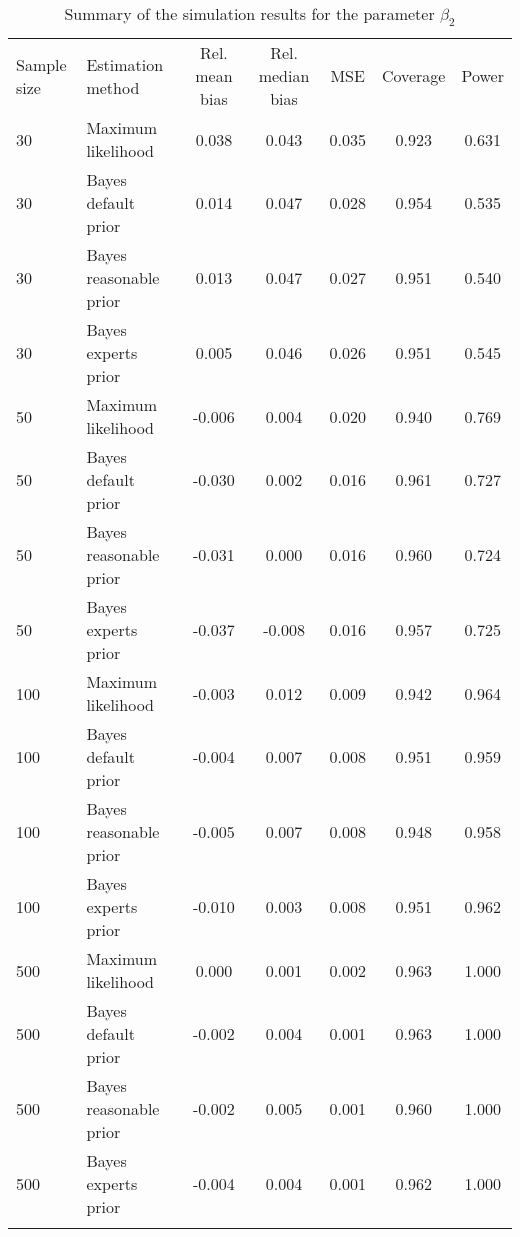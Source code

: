 \documentclass[graybox]{svmult}
\begin{document}
\begin{table}
\caption{Summary of the simulation results for the parameter $\beta_2$}
\begin{tabular}[t]{llccccc}
\hline\noalign{\smallskip}
Sample size & Estimation method & Rel. mean bias & Rel. median bias & MSE & Coverage & Power\\
\noalign{\smallskip}\svhline\noalign{\smallskip}
30 & Maximum likelihood & 0.038 & 0.043 & 0.035 & 0.923 & 0.631\\
30 & Bayes default prior & 0.014 & 0.047 & 0.028 & 0.954 & 0.535\\
30 & Bayes reasonable prior & 0.013 & 0.047 & 0.027 & 0.951 & 0.540\\
30 & Bayes experts prior & 0.005 & 0.046 & 0.026 & 0.951 & 0.545\\
\noalign{\smallskip}
50 & Maximum likelihood & -0.006 & 0.004 & 0.020 & 0.940 & 0.769\\
50 & Bayes default prior & -0.030 & 0.002 & 0.016 & 0.961 & 0.727\\
50 & Bayes reasonable prior & -0.031 & 0.000 & 0.016 & 0.960 & 0.724\\
50 & Bayes experts prior & -0.037 & -0.008 & 0.016 & 0.957 & 0.725\\
\noalign{\smallskip}
100 & Maximum likelihood & -0.003 & 0.012 & 0.009 & 0.942 & 0.964\\
100 & Bayes default prior & -0.004 & 0.007 & 0.008 & 0.951 & 0.959\\
100 & Bayes reasonable prior & -0.005 & 0.007 & 0.008 & 0.948 & 0.958\\
100 & Bayes experts prior & -0.010 & 0.003 & 0.008 & 0.951 & 0.962\\
\noalign{\smallskip}
500 & Maximum likelihood & 0.000 & 0.001 & 0.002 & 0.963 & 1.000\\
500 & Bayes default prior & -0.002 & 0.004 & 0.001 & 0.963 & 1.000\\
500 & Bayes reasonable prior & -0.002 & 0.005 & 0.001 & 0.960 & 1.000\\
500 & Bayes experts prior & -0.004 & 0.004 & 0.001 & 0.962 & 1.000\\
\noalign{\smallskip}\hline\noalign{\smallskip}
\multicolumn{7}{l}{\textit{Note: } Rel. = Relative; MSE = Mean Square Error.}\\
\end{tabular}
\end{table}
\end{document}
